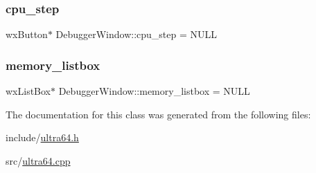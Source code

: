 \subsubsection{\texorpdfstring{cpu\+\_\+step}{cpu\_step}}
{\footnotesize\ttfamily wx\+Button$\ast$ Debugger\+Window\+::cpu\+\_\+step = N\+U\+LL}

\mbox{\label{class_debugger_window_a5907a83225613994ce1bf78e170f3e69}} 
\subsubsection{\texorpdfstring{memory\+\_\+listbox}{memory\_listbox}}
{\footnotesize\ttfamily wx\+List\+Box$\ast$ Debugger\+Window\+::memory\+\_\+listbox = N\+U\+LL}



The documentation for this class was generated from the following files\+:\begin{DoxyCompactItemize}
\item 
include/\hyperlink{ultra64_8h}{ultra64.\+h}\item 
src/\hyperlink{ultra64_8cpp}{ultra64.\+cpp}\end{DoxyCompactItemize}
